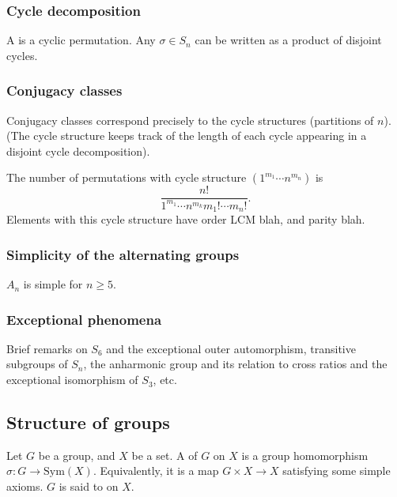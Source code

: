\subsubsection{Cycle decomposition}

A  is a cyclic permutation. Any $\sigma \in S_n$ can be written as a product of disjoint cycles.

\subsubsection{Conjugacy classes}

Conjugacy classes correspond precisely to the cycle structures (partitions of $n$). (The cycle structure keeps track of the length of each cycle appearing in a disjoint cycle decomposition).

\begin{theorem}
The number of permutations with cycle structure $(1^{m_1} \cdots n^{m_n})$ is
\[ \frac{n!}{1^{m_1} \cdots n^{m_k} m_1! \cdots m_n!}. \]
Elements with this cycle structure have order LCM blah, and parity blah.
\end{theorem}

\subsubsection{Simplicity of the alternating groups}

\begin{theorem}[C.\ Jordan, 1875]
$A_n$ is simple for $n \geq 5$.
\end{theorem}

\subsubsection{Exceptional phenomena}

Brief remarks on $S_6$ and the exceptional outer automorphism, transitive subgroups of $S_n$, the anharmonic group and its relation to cross ratios and the exceptional isomorphism of $S_3$, etc.

\subsection{Structure of groups}

\begin{definition}
Let $G$ be a group, and $X$ be a set. A  of $G$ on $X$ is a group homomorphism $\sigma : G \to \mathrm{Sym}(X)$. Equivalently, it is a map $G \times X \to X$ satisfying some simple axioms. $G$ is said to  on $X$.
\end{definition}

